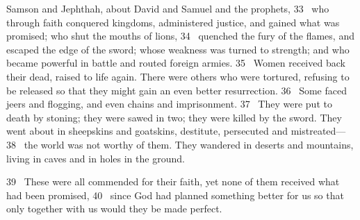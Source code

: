 Samson
and Jephthah,
about David
and Samuel
and the prophets,
33 
who through faith conquered kingdoms,
administered justice, and gained what was promised; who shut the mouths of lions,
34 
quenched the fury of the flames,
and escaped the edge of the sword;
whose weakness was turned to strength;
and who became powerful in battle and routed foreign armies.
35 
Women received back their dead, raised to life again.
There were others who were tortured, refusing to be released so that they might gain an even better resurrection.
36 
Some faced jeers and flogging,
and even chains and imprisonment.
37 
They were put to death by stoning;
they were sawed in two; they were killed by the sword.
They went about in sheepskins and goatskins,
destitute, persecuted and mistreated—
38 
the world was not worthy of them. They wandered in deserts and mountains, living in caves
and in holes in the ground.
\par
39 
These were all commended
for their faith, yet none of them received what had been promised,
40 
since God had planned something better for us so that only together with us
would they be made perfect.


\bye

